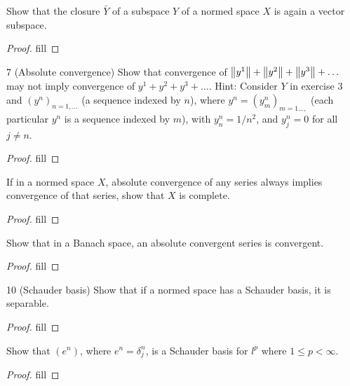 \begin{exercise}{6}
Show that the closure $\bar{Y}$ of a subspace $Y$ of a normed space $X$ is again a vector subspace.
\end{exercise}
\begin{proof}
fill
\end{proof}

\begin{exercise}{7 (Absolute convergence)}
Show that convergence of $\left\lVert y^1\right\rVert+\left\lVert y^2\right\rVert+\left\lVert y^3\right\rVert+\dots$ may not imply convergence of $y^1+y^2+y^3+\dots$. Hint: Consider $Y$ in exercise 3 and $(y^n)_{n=1,\dots}$ (a sequence indexed by $n$), where $y^n=(y^n_m)_{m=1\dots,}$ (each particular $y^n$ is a sequence indexed by $m$), with $y^n_n=1/n^2$, and $y^n_j=0$ for all $j\neq n$.
\end{exercise}
\begin{proof}
fill
\end{proof}

\begin{exercise}{8}
If in a normed space $X$, absolute convergence of any series always implies convergence of that series, show that $X$ is complete.
\end{exercise}
\begin{proof}
fill
\end{proof}

\begin{exercise}{9}
Show that in a Banach space, an absolute convergent series is convergent.
\end{exercise}
\begin{proof}
fill
\end{proof}

\begin{exercise}{10 (Schauder basis)}
Show that if a normed space has a Schauder basis, it is separable.
\end{exercise}
\begin{proof}
fill
\end{proof}

\begin{exercise}{11}
Show that $(e^n)$, where $e^n=\delta^n_j$, is a Schauder basis for $l^p$ where $1\leq p<\infty$.
\end{exercise}
\begin{proof}
fill
\end{proof}
